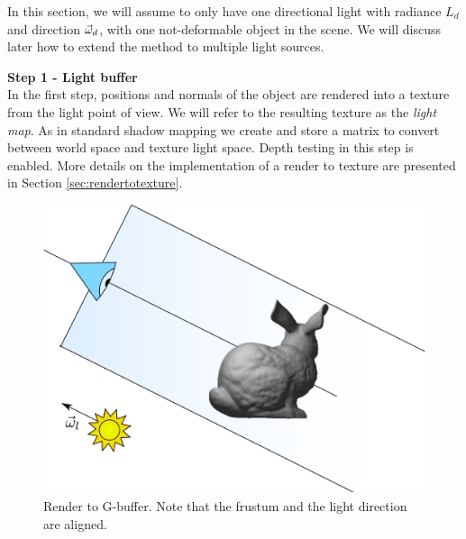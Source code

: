 In this section, we will assume to only have one directional light with radiance $L_d$ and direction $\vec{\omega}_d$, with one not-deformable object in the scene. We will discuss later how to extend the method to multiple light sources.

\textbf{Step 1 - Light buffer} \\
In the first step, positions and normals of the object are rendered into a texture from the light point of view. We will refer to the resulting texture as the \emph{light map}. As in standard shadow mapping we create and store a matrix to convert between world space and texture light space. Depth testing in this step is enabled. More details on the implementation of a render to texture are presented in Section \ref{sec:rendertotexture}.

\begin{figure}[!ht]
\centering
\includegraphics[width=0.8 \linewidth]{images/method/step1.pdf}
\caption{Render to G-buffer. Note that the frustum and the light direction are aligned.}
\label{fig:step1}
\end{figure} 

